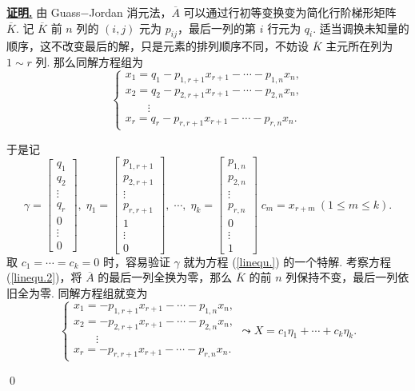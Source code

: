 \documentclass[10pt,openany]{article}
\theoremstyle{thmstyle} %
\theoremstyle{defstyle} %
\theoremstyle{prostyle} %
\theoremstyle{exastyle}
\theoremstyle{remstyle}
\renewenvironment{proof}[1][证明]{\par\underline{\textbf{#1.}} \;\fangsong}{\qed\par}
\begin{document}
\begin{proof}
	由 Guass\(-\)Jordan 消元法，\( \overline{A} \) 可以通过行初等变换变为简化行阶梯形矩阵 \( \overline{K} \). 记 \( \overline{K} \) 前 \( n \) 列的 \( (i,j) \) 元为 \( p_{ij} \)，最后一列的第 \( i \) 行元为 \( q_i \). 适当调换未知量的顺序，这不改变最后的解，只是元素的排列顺序不同，不妨设 \( \overline{K} \) 主元所在列为 \( 1 \sim r \) 列. 那么同解方程组为
	\[ \left\{ \begin{array}{l}
		x_1= q_1-p_{1,r+1}x_{r+1}-\cdots-p_{1,n}x_n, \\
		x_2= q_2-p_{2,r+1}x_{r+1}-\cdots-p_{2,n}x_n, \\
		\qquad \vdots \\
		x_r= q_r-p_{r,r+1}x_{r+1}-\cdots-p_{r,n}x_n. 
	\end{array}\right. \]
	
	于是记
	\[ \gamma=\begin{bmatrix}
		q_1 \\ q_2 \\ \vdots \\ q_r \\ 0  \\ \vdots \\ 0
	\end{bmatrix},\; \eta_1=\begin{bmatrix}
		p_{1,r+1} \\ p_{2,r+1} \\ \vdots \\ p_{r,r+1} \\ 1 \\ \vdots \\ 0
	\end{bmatrix}, \; \cdots, \; \eta_k=\begin{bmatrix}
		p_{1,n} \\ p_{2,n} \\ \vdots \\ p_{r,n} \\ 0 \\ \vdots \\ 1
	\end{bmatrix}  \; c_{m}=x_{r+m} \ ( 1 \leq m \leq k). \]
	取 \( c_1=\cdots=c_k=0 \) 时，容易验证 \( \gamma \) 就为方程 (\ref{linequ.}) 的一个特解. 考察方程 (\ref{linequ.2})，将 \( \overline{A} \) 的最后一列全换为零，那么 \( \overline{K} \) 的前 \( n \) 列保持不变，最后一列依旧全为零. 同解方程组就变为
	\[ \left\{ \begin{array}{l}
		x_1= -p_{1,r+1}x_{r+1}-\cdots-p_{1,n}x_n, \\
		x_2= -p_{2,r+1}x_{r+1}-\cdots-p_{2,n}x_n, \\
		\qquad \vdots \\
		x_r= -p_{r,r+1}x_{r+1}-\cdots-p_{r,n}x_n. 
	\end{array}\right. \leadsto X=c_1\eta_1+\cdots+c_k\eta_k. \]
	

\end{proof}
\end{document}
